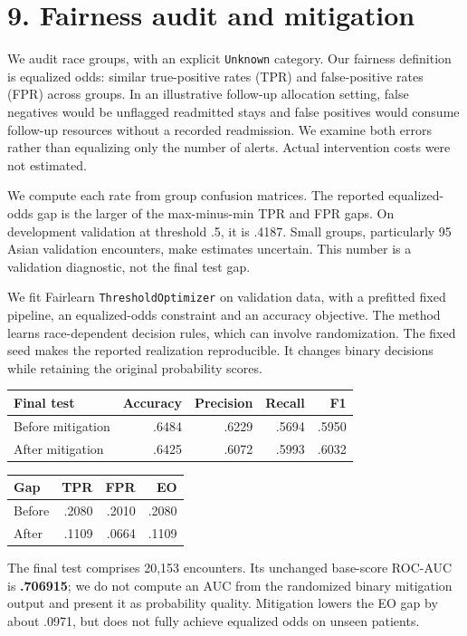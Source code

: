 \documentclass[11pt,a4paper]{article}
\newcommand{\pageheading}[2]{\section*{\color{ink}#1. #2}}
\newcommand{\nextpage}{\clearpage}
\begin{document}
\nextpage
\pageheading{9}{Fairness audit and mitigation}
We audit race groups, with an explicit \texttt{Unknown} category. Our fairness definition is equalized odds: similar true-positive rates (TPR) and false-positive rates (FPR) across groups. In an illustrative follow-up allocation setting, false negatives would be unflagged readmitted stays and false positives would consume follow-up resources without a recorded readmission. We examine both errors rather than equalizing only the number of alerts. Actual intervention costs were not estimated.

We compute each rate from group confusion matrices. The reported equalized-odds gap is the larger of the max-minus-min TPR and FPR gaps. On development validation at threshold .5, it is .4187. Small groups, particularly 95 Asian validation encounters, make estimates uncertain. This number is a validation diagnostic, not the final test gap.

We fit Fairlearn \texttt{ThresholdOptimizer} on validation data, with a prefitted fixed pipeline, an equalized-odds constraint and an accuracy objective. The method learns race-dependent decision rules, which can involve randomization. The fixed seed makes the reported realization reproducible. It changes binary decisions while retaining the original probability scores.

\begin{center}\small\begin{tabular}{lrrrr}\toprule
Final test & Accuracy & Precision & Recall & F1\\\midrule
Before mitigation & .6484 & .6229 & .5694 & .5950\\
After mitigation & .6425 & .6072 & .5993 & .6032\\\bottomrule
\end{tabular}\qquad
\begin{tabular}{lrrr}\toprule
Gap & TPR & FPR & EO\\\midrule
Before & .2080 & .2010 & .2080\\
After & .1109 & .0664 & .1109\\\bottomrule
\end{tabular}\end{center}
The final test comprises 20,153 encounters. Its unchanged base-score ROC-AUC is \textbf{.706915}; we do not compute an AUC from the randomized binary mitigation output and present it as probability quality. Mitigation lowers the EO gap by about .0971, but does not fully achieve equalized odds on unseen patients.
\end{document}
